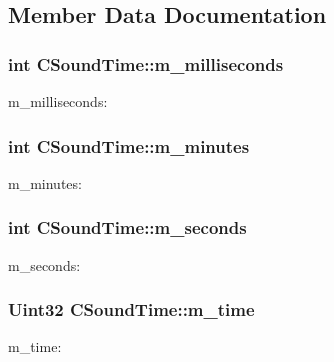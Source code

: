 \subsection{Member Data Documentation}
\subsubsection[{\texorpdfstring{m\+\_\+milliseconds}{m_milliseconds}}]{\setlength{\rightskip}{0pt plus 5cm}int C\+Sound\+Time\+::m\+\_\+milliseconds\hspace{0.3cm}{\ttfamily [private]}}\hypertarget{class_c_sound_time_aba69cd6f3a99395314aef0c4fcd70aef}{}\label{class_c_sound_time_aba69cd6f3a99395314aef0c4fcd70aef}
m\+\_\+milliseconds\+: 
\subsubsection[{\texorpdfstring{m\+\_\+minutes}{m_minutes}}]{\setlength{\rightskip}{0pt plus 5cm}int C\+Sound\+Time\+::m\+\_\+minutes\hspace{0.3cm}{\ttfamily [private]}}\hypertarget{class_c_sound_time_abb5d08c723c13e6f7279c20fd09e1d2e}{}\label{class_c_sound_time_abb5d08c723c13e6f7279c20fd09e1d2e}
m\+\_\+minutes\+: 
\subsubsection[{\texorpdfstring{m\+\_\+seconds}{m_seconds}}]{\setlength{\rightskip}{0pt plus 5cm}int C\+Sound\+Time\+::m\+\_\+seconds\hspace{0.3cm}{\ttfamily [private]}}\hypertarget{class_c_sound_time_a54970b01c99641895c48a5c358b9c3c7}{}\label{class_c_sound_time_a54970b01c99641895c48a5c358b9c3c7}
m\+\_\+seconds\+: 
\subsubsection[{\texorpdfstring{m\+\_\+time}{m_time}}]{\setlength{\rightskip}{0pt plus 5cm}Uint32 C\+Sound\+Time\+::m\+\_\+time\hspace{0.3cm}{\ttfamily [private]}}\hypertarget{class_c_sound_time_a99122b938256cded3aeffe92bc8b3715}{}\label{class_c_sound_time_a99122b938256cded3aeffe92bc8b3715}
m\+\_\+time\+: 

